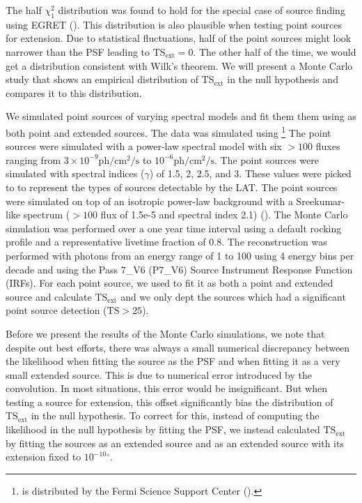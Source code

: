 \documentclass[12pt,preprint]{aastex}
\newcommand{\mev}{\text{MeV}\xspace}
\newcommand{\gev}{\text{GeV}\xspace}
\newcommand{\ph}{\text{ph}\xspace}
\newcommand{\cm}{\text{cm}\xspace}
\renewcommand{\sec}{\text{s}\xspace}
\newcommand{\tsext}{{\ensuremath{\text{TS}_\text{ext}}}\xspace}
\newcommand{\ts}{\text{TS}\xspace}
\renewcommand{\deg}{\ensuremath{^\circ}\xspace}
\newcommand{\pointlike}{\text{\em pointlike}\xspace}
\newcommand{\gtobssim}{\text{\em gtobssim}\xspace}
\begin{document}
The half $\chi^2_1$ distribution was found to hold for the special case
of source finding using EGRET (\cite{mattox_egret}). This distribution
is also plausible when testing point sources for extension. Due to
statistical fluctuations, half of the point sources might look narrower
than the PSF leading to $\tsext=0$. The other half of the time, we would
get a distribution consistent with Wilk's theorem. We will present a
Monte Carlo study that shows an empirical distribution of \tsext in the
null hypothesis and compares it to this distribution.

We simulated point sources of varying spectral models and fit them
them using \pointlike as both point and extended sources. The data was
simulated using \gtobssim\footnote{\gtobssim is distributed
by the Fermi Science Support Center (\cite{fssc}).}
The point sources were simulated with a power-law spectral model with
six $>100$ \mev fluxes ranging from $3\times 10^{-9} \ph/\cm^2/\sec$ to
$10^{-6} \ph/\cm^2/\sec$.  The point sources were simulated with spectral
indices ($\gamma$) of 1.5, 2, 2.5, and 3.  These values were picked to
to represent the types of sources detectable by the LAT.  The point
sources were simulated on top of an isotropic power-law background
with a Sreekumar-like spectrum ($>100$ \mev flux of 1.5e-5 and spectral
index 2.1) (\cite{sreekumar_isotropic}).  The Monte Carlo simulation was
performed over a one year time interval using a default rocking profile
and a representative livetime fraction of 0.8.  The reconstruction was
performed with photons from an energy range of 1 \gev to 100 \gev using 4
energy bins per decade and using the 
Pass 7\_V6 (P7\_V6) Source Instrument
Response Function (IRFs).  For each point source, we used \pointlike
to fit it as both a point and extended source and calculate \tsext and
we only dept the sources which had a significant point source detection
($\ts>25$).

Before we present the results of the Monte Carlo simulations, we note
that despite out best efforts, there was always a small numerical
discrepancy between the likelihood when fitting the source as the PSF
and when fitting it as a very small extended source. This is due to
numerical error introduced by the convolution.  In most situations, this
error would be insignificant. But when testing a source for extension,
this offset significantly bias the distribution of \tsext in the null
hypothesis. To correct for this, instead of computing the likelihood in
the null hypothesis by fitting the PSF, we instead calculated \tsext by
fitting the sources as an extended source and as an extended source with
its extension fixed to ${10^{-10}}\deg$.
\end{document}

